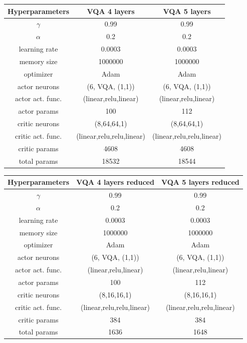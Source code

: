 \newline
\vspace{0.2cm}
\newline
\begin{tabular}{|c|c|c|}
	\hline
	Hyperparameters & VQA 4 layers & VQA 5 layers  \\
	\hline
	$\gamma$ & 0.99 & 0.99  \\
	\hline
	$\alpha$ & 0.2 & 0.2  \\
	\hline
	learning rate & 0.0003 & 0.0003  \\
	\hline
	memory size & 1000000 & 1000000   \\
	\hline
	optimizer & Adam & Adam  \\
	\hline
	actor neurons  & (6, VQA, (1,1)) & (6, VQA, (1,1))  \\
	\hline
	actor act. func. & (linear,relu,linear) & (linear,relu,linear) \\
	\hline
	actor params & 100 & 112 \\
	\hline
	critic neurons & (8,64,64,1) & (8,64,64,1)  \\
	\hline
	critic act. func. & (linear,relu,relu,linear) & (linear,relu,relu,linear) \\
	\hline
	critic params & 4608 & 4608 \\
	\hline
	total params & 18532 & 18544 \\
	\hline
\end{tabular}
\newline
\vspace{0.5 cm}
\newline
\begin{tabular}{|c|c|c|}
	\hline
	Hyperparameters & VQA 4 layers reduced & VQA 5 layers reduced  \\
	\hline
	$\gamma$ & 0.99 & 0.99   \\
	\hline
	$\alpha$ & 0.2 & 0.2   \\
	\hline
	learning rate & 0.0003 & 0.0003   \\
	\hline
	memory size & 1000000 & 1000000   \\
	\hline
	optimizer & Adam & Adam  \\
	\hline
	actor neurons  & (6, VQA, (1,1)) & (6, VQA, (1,1))  \\
	\hline
	actor act. func. & (linear,relu,linear) & (linear,relu,linear) \\
	\hline
	actor params & 100 & 112  \\
	\hline
	critic neurons & (8,16,16,1) & (8,16,16,1)  \\
	\hline
	critic act. func. & (linear,relu,relu,linear) & (linear,relu,relu,linear) \\
	\hline
	critic params & 384 & 384\\
	\hline
	total params & 1636 & 1648\\
	\hline
\end{tabular}
